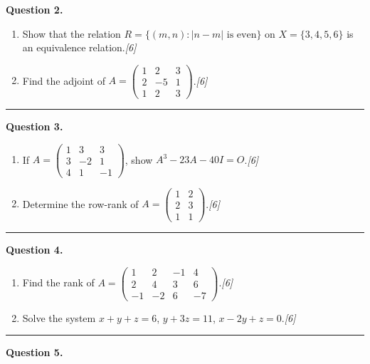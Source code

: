 \documentclass[11pt,a4paper]{article}
\newcommand{\pts}[1]{\hfill   \textit{[#1]}}
\begin{document}
\medskip


\noindent   \textbf{Question 2.}

\begin{enumerate}[label=(\alph*),leftmargin=*,itemsep=5pt]
  \item Show that the relation $R=\{(m,n):|n-m| \text{ is even}\}$ on $X=\{3,4,5,6\}$ is an equivalence relation.\pts{6}
  \item Find the adjoint of $A=
\begin{pmatrix}1&2&3\\2&-5&1\\1&2&3\end{pmatrix}$.\pts{6}
\end{enumerate}
\medskip\rule{\linewidth}{0.2pt}

\medskip


\noindent   \textbf{Question 3.}

\begin{enumerate}[label=(\alph*),leftmargin=*,itemsep=5pt]
  \item If $A=
\begin{pmatrix}1&3&3\\3&-2&1\\4&1&-1\end{pmatrix}$, show $A^3-23A-40I=O$.\pts{6}
  \item Determine the row-rank of $A=
\begin{pmatrix}1&2\\2&3\\1&1\end{pmatrix}$.\pts{6}
\end{enumerate}
\medskip\rule{\linewidth}{0.2pt}

\medskip


\noindent   \textbf{Question 4.}

\begin{enumerate}[label=(\alph*),leftmargin=*,itemsep=5pt]
  \item Find the rank of $A=
\begin{pmatrix}1&2&-1&4\\2&4&3&6\\-1&-2&6&-7\end{pmatrix}$.\pts{6}
  \item Solve the system $x+y+z=6$, $y+3z=11$, $x-2y+z=0$.\pts{6}
\end{enumerate}
\medskip\rule{\linewidth}{0.2pt}

\medskip


\noindent   \textbf{Question 5.}
\end{document}
